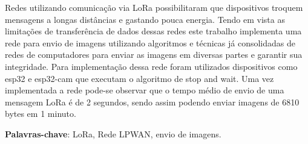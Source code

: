 \documentclass[
article,			%
12pt,				%
oneside,			%
a4paper,			%
english,			%
brazil,				%
sumario=tradicional
]{abntex2}
\begin{document}

\frenchspacing 


%
%

\maketitle



\begin{resumoumacoluna}
    Redes utilizando comunicação via LoRa possibilitaram que dispositivos troquem mensagens a longas distâncias e gastando pouca energia. Tendo em vista as limitações de transferência de dados dessas redes este trabalho implementa uma rede para envio de imagens utilizando algoritmos e técnicas já consolidadas de redes de computadores para enviar as imagens em diversas partes e garantir sua integridade. Para implementação dessa rede foram utilizados dispositivos como esp32 e esp32-cam que executam o algoritmo de stop and wait. Uma vez implementada a rede pode-se observar que o tempo médio de envio de uma mensagem LoRa é de 2 segundos, sendo assim podendo enviar imagens de 6810 bytes em 1 minuto.

  \textbf{Palavras-chave}: LoRa, Rede LPWAN, envio de imagens.
  \vspace{\onelineskip}
  \noindent
\end{resumoumacoluna}
\end{document}
